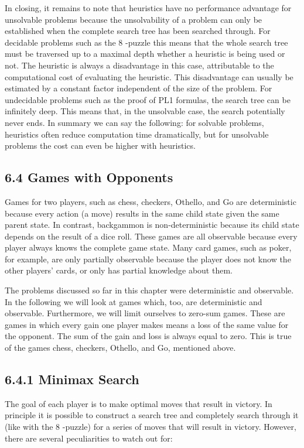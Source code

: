 \documentclass[10pt]{book}
\begin{document}
\begin{center}
In closing, it remains to note that heuristics have no performance advantage for unsolvable problems because the unsolvability of a problem can only be established when the complete search tree has been searched through. For decidable problems such as the 8 -puzzle this means that the whole search tree must be traversed up to a maximal depth whether a heuristic is being used or not. The heuristic is always a disadvantage in this case, attributable to the computational cost of evaluating the heuristic. This disadvantage can usually be estimated by a constant factor independent of the size of the problem. For undecidable problems such as the proof of PL1 formulas, the search tree can be infinitely deep. This means that, in the unsolvable case, the search potentially never ends. In summary we can say the following: for solvable problems, heuristics often reduce computation time dramatically, but for unsolvable problems the cost can even be higher with heuristics.

\subsection*{6.4 Games with Opponents}
Games for two players, such as chess, checkers, Othello, and Go are deterministic because every action (a move) results in the same child state given the same parent state. In contrast, backgammon is non-deterministic because its child state depends on the result of a dice roll. These games are all observable because every player always knows the complete game state. Many card games, such as poker, for example, are only partially observable because the player does not know the other players' cards, or only has partial knowledge about them.


The problems discussed so far in this chapter were deterministic and observable. In the following we will look at games which, too, are deterministic and observable. Furthermore, we will limit ourselves to zero-sum games. These are games in which every gain one player makes means a loss of the same value for the opponent. The sum of the gain and loss is always equal to zero. This is true of the games chess, checkers, Othello, and Go, mentioned above.

\subsection*{6.4.1 Minimax Search}
The goal of each player is to make optimal moves that result in victory. In principle it is possible to construct a search tree and completely search through it (like with the 8 -puzzle) for a series of moves that will result in victory. However, there are several peculiarities to watch out for:


\end{center}
\end{document}
